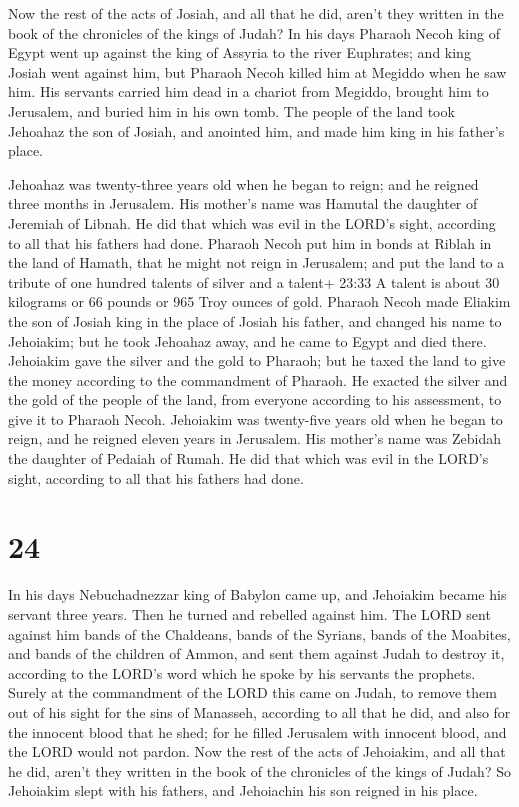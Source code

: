  Now the rest of the acts of Josiah, and all that he did,
aren't they written in the book of the chronicles of the kings of Judah?
 In his days Pharaoh Necoh king of Egypt went up against
the king of Assyria to the river Euphrates; and king Josiah went against
him, but Pharaoh Necoh killed him at Megiddo when he saw him.
 His servants carried him dead in a chariot from Megiddo,
brought him to Jerusalem, and buried him in his own tomb. The people of
the land took Jehoahaz the son of Josiah, and anointed him, and made him
king in his father's place.

 Jehoahaz was twenty-three years old when he began to
reign; and he reigned three months in Jerusalem. His mother's name was
Hamutal the daughter of Jeremiah of Libnah.  He did that
which was evil in the LORD's sight, according to all that his fathers
had done.  Pharaoh Necoh put him in bonds at Riblah in the
land of Hamath, that he might not reign in Jerusalem; and put the land
to a tribute of one hundred talents of silver and a talent+ 23:33 A
talent is about 30 kilograms or 66 pounds or 965 Troy ounces of gold.
 Pharaoh Necoh made Eliakim the son of Josiah king in the
place of Josiah his father, and changed his name to Jehoiakim; but he
took Jehoahaz away, and he came to Egypt and died there. 
Jehoiakim gave the silver and the gold to Pharaoh; but he taxed the land
to give the money according to the commandment of Pharaoh. He exacted
the silver and the gold of the people of the land, from everyone
according to his assessment, to give it to Pharaoh Necoh. 
Jehoiakim was twenty-five years old when he began to reign, and he
reigned eleven years in Jerusalem. His mother's name was Zebidah the
daughter of Pedaiah of Rumah.  He did that which was evil
in the LORD's sight, according to all that his fathers had done.

\hypertarget{section-23}{%
\section{24}\label{section-23}}

 In his days Nebuchadnezzar king of Babylon came up, and
Jehoiakim became his servant three years. Then he turned and rebelled
against him.  The LORD sent against him bands of the
Chaldeans, bands of the Syrians, bands of the Moabites, and bands of the
children of Ammon, and sent them against Judah to destroy it, according
to the LORD's word which he spoke by his servants the prophets.
 Surely at the commandment of the LORD this came on Judah,
to remove them out of his sight for the sins of Manasseh, according to
all that he did,  and also for the innocent blood that he
shed; for he filled Jerusalem with innocent blood, and the LORD would
not pardon.  Now the rest of the acts of Jehoiakim, and all
that he did, aren't they written in the book of the chronicles of the
kings of Judah?  So Jehoiakim slept with his fathers, and
Jehoiachin his son reigned in his place.

